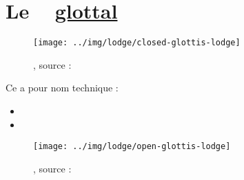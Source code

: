 \newpage

\section{Le \son~  \href{https://en.wikipedia.org/wiki/Glottal\_stop}{glottal}
  }\label{sec:glottal}

\begin{center}
  \begin{figure}[h]
    \centering
    \texttt{[image: ../img/lodge/closed-glottis-lodge]}
    \caption{, source : \lodge}
    \label{fig:clos-glot}
  \end{figure}
\end{center}

  Ce \son a pour nom technique :%
  \begin{itemize}%
  \item {}%
  \item {}%
  \end{itemize}

\begin{center}
  \begin{figure}[h]
    \centering
    \texttt{[image: ../img/lodge/open-glottis-lodge]}
    \caption{, source : \lodge}
    \label{fig:open-glot}
  \end{figure}
\end{center}

  \indicsound
  
